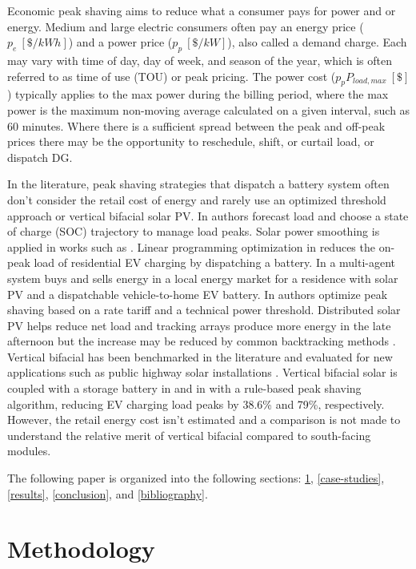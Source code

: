 \documentclass[journal,article,submit,pdftex,moreauthors]{Definitions/mdpi}
\begin{document}
Economic peak shaving aims to reduce what a consumer pays for power and or energy. Medium and large electric consumers often pay an energy price ($p_e\ [\$/kWh]$) and a power price ($p_p\ [\$/kW]$), also called a demand charge. Each may vary with time of day, day of week, and season of the year, which is often referred to as time of use (TOU) or peak pricing. The power cost ($p_p P_{load,max}\ [\$]$) typically applies to the max power during the billing period, where the max power is the maximum non-moving average calculated on a given interval, such as 60 minutes. Where there is a sufficient spread between the peak and off-peak prices there may be the opportunity to reschedule, shift, or curtail load, or dispatch DG.

  In the literature, peak shaving strategies that dispatch a battery system often don't consider the retail cost of energy and rarely use an optimized threshold approach or vertical bifacial solar PV. In \cite{Reihani2016} authors forecast load and choose a state of charge (SOC) trajectory to manage load peaks. Solar power smoothing is applied in works such as \cite{Lavrova2012}. Linear programming optimization in \cite{Lee2014} reduces the on-peak load of residential EV charging by dispatching a battery. In \cite{Gazafroudi2018} a multi-agent system buys and sells energy in a local energy market for a residence with solar PV and a dispatchable vehicle-to-home EV battery. In \cite{Zheng2015} authors optimize peak shaving based on a rate tariff and a technical power threshold. Distributed solar PV  helps reduce net load and tracking arrays produce more energy in the late afternoon \cite{Faranda2011} but the increase may be reduced by common backtracking methods \cite{Dolara2012}. Vertical bifacial has been benchmarked in the literature and evaluated for new applications such as public highway solar installations \cite{Niccolai2022}. Vertical bifacial solar is coupled with a storage battery in \cite{Wallberg2022} and in \cite{Castellucci2022} with a rule-based peak shaving algorithm, reducing EV charging load peaks by 38.6\% and 79\%, respectively. However, the retail energy cost isn't estimated and a comparison is not made to understand the relative merit of vertical bifacial compared to south-facing modules.

  The following paper is organized into the following sections: \ref{methodology}, \ref{case-studies}, \ref{results}, \ref{conclusion}, and \ref{bibliography}.


  \section{Methodology}\label{methodology}%
\end{document}
